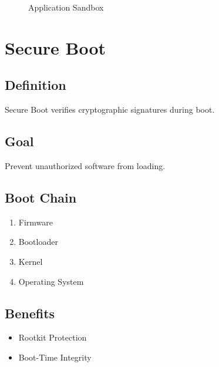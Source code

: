 \begin{figure}[h]
\centering
{}
\caption{Application Sandbox}
\end{figure}

\section{Secure Boot}

\subsection{Definition}

Secure Boot verifies cryptographic signatures during boot.

\subsection{Goal}

Prevent unauthorized software from loading.

\subsection{Boot Chain}

\begin{enumerate}
\item Firmware
\item Bootloader
\item Kernel
\item Operating System
\end{enumerate}

\subsection{Benefits}

\begin{itemize}
\item Rootkit Protection
\item Boot-Time Integrity
\end{itemize}

